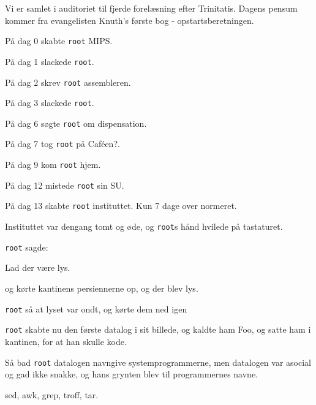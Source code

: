 \documentclass[a4paper,11pt]{article}
\begin{document}
\begin{sketch}

   Vi er samlet i auditoriet til fjerde forelæsning efter Trinitatis.
   Dagens pensum kommer fra evangelisten Knuth's første bog - opstartsberetningen.

   På dag 0 skabte \texttt{root} MIPS.

   På dag 1 slackede \texttt{root}.

   På dag 2 skrev \texttt{root} assembleren.

   På dag 3 slackede \texttt{root}.

   På dag 6 søgte \texttt{root} om dispensation.

   På dag 7 tog \texttt{root} på Caféen?.

   På dag 9 kom \texttt{root} hjem.

   På dag 12 mistede \texttt{root} sin SU.

   På dag 13 skabte \texttt{root} instituttet.  Kun 7 dage over normeret.

   Instituttet var dengang tomt og øde, og \texttt{root}s hånd
  hvilede på tastaturet.

   \texttt{root} sagde:

   Lad der være lys.

   og kørte kantinens persiennerne op, og der blev lys.


   \texttt{root} så at lyset var ondt, og kørte dem ned igen


   \texttt{root} skabte nu den første datalog i sit billede, og
  kaldte ham Foo, og satte ham i kantinen, for at han skulle kode.


   Så bad \texttt{root} datalogen navngive systemprogrammerne, men
  datalogen var asocial og gad ikke snakke, og hans grynten blev til
  programmernes navne.


   sed, awk, grep, troff, tar.


\end{sketch}
\end{document}
